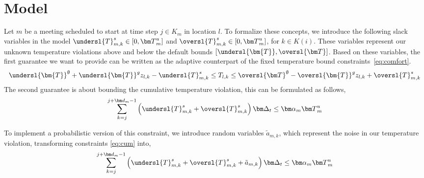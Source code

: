 					


\chapter{Model}
\label{cha:atc_model}

Let $m$ be a meeting scheduled to start at time step $j\in K_m$ in location $l$. To formalize these concepts, we introduce the following slack variables in the model $\undersl{T}^{s}_{m,k} \in [0, {\bm T}^u_m]$ and $\oversl{T}^{s}_{m,k} \in [0, {\bm T}^u_m]$, for $k\in K(i)$. These variables represent our unknown temperature violations above and below the default bounds $[\undersl{\bm{T}}, \oversl{\bm T}]$.
Based on these variables, the first guarantee we want to provide can be written as the adaptive counterpart of the fixed temperature bound constraints~\eqref{eq:comfort}.
\begin{equation}\label{eq:rob:comfort}
\undersl{\bm{T}}^{\emptyset} + \undersl{\bm{T}}^{g}z_{l,k} - \undersl{T}^{s}_{m,k} \leq T_{l,k} \leq \oversl{\bm T}^{\emptyset} - \oversl{\bm{T}}^{g}z_{l,k} + \oversl{T}^{s}_{m,k}
\end{equation} 
%
The second guarantee is about bounding the cumulative temperature violation, this can be formulated as follows,
\begin{equation}
\sum\limits_{k=j}^{j+{\bm d}_m -1}\left(\undersl{T}^{s}_{m,k}   +  \oversl{T}^{s}_{m,k} \right) {\bm \Delta_t} \leq {\bm \alpha}_m {\bm T}^u_m \label{eq:cum}
\end{equation}

To implement a probabilistic version of this constraint, we introduce random variables $\tilde{a}_{m,k}$, which represent the noise in our temperature violation, transforming constraints \eqref{eq:cum} into,
\begin{equation}
\sum\limits_{k=j}^{j+{\bm d}_m -1}\left(\undersl{T}^{s}_{m,k}   +  \oversl{T}^{s}_{m,k} + \tilde{a}_{m,k} \right) {\bm \Delta_t} \leq {\bm \alpha}_m {\bm T}^u_m \label{eq:cum_rand}
\end{equation}

